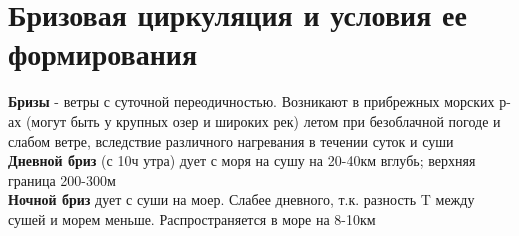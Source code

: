
\section{Бризовая циркуляция и условия ее формирования}
\textbf{Бризы} - ветры с суточной переодичностью. Возникают в прибрежных морских р-ах (могут быть у крупных озер и широких рек) летом при безоблачной погоде и слабом ветре, вследствие различного нагревания в течении суток и суши\\
\textbf{Дневной бриз} (с 10ч утра) дует с моря на сушу на 20-40км вглубь; верхняя граница 200-300м\\
\textbf{Ночной бриз} дует с суши на моер. Слабее дневного, т.к. разность T между сушей и морем меньше. Распространяется в море на 8-10км

